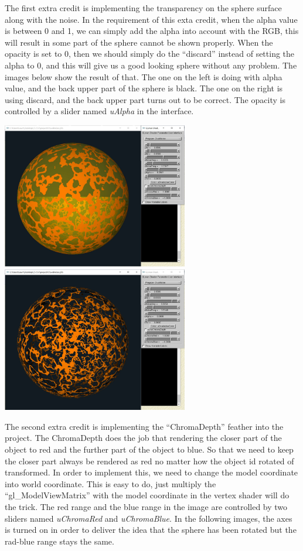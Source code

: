 \documentclass[letterpaper,14pt,titlepage,fleqn]{article}
\begin{document}
The first extra credit is implementing the transparency on the sphere surface along with the noise. In the requirement of this exta credit, when the alpha value is between 0 and 1, we can simply add the alpha into account with the RGB, this will result in some part of the sphere cannot be shown properly. When the opacity is set to 0, then we should simply do the ``discard'' instead of setting the alpha to 0, and this will give us a good looking sphere without any problem. The images below show the result of that. The one on the left is doing with alpha value, and the back upper part of the sphere is black. The one on the right is using discard, and the back upper part turns out to be correct. The opacity is controlled by a slider named \textit{uAlpha} in the interface.
\begin{center}
	\includegraphics[width=3.2in]{E11.jpg}
	\includegraphics*[width=3.2in]{E12.jpg}
\end{center}
The second extra credit is implementing the ``ChromaDepth'' feather into the project. The ChromaDepth does the job that rendering the closer part of the object to red and the further part of the object to blue. So that we need to keep the closer part always be rendered as red no matter how the object id rotated of transformed. In order to implement this, we need to change the model coordinate into world coordinate. This is easy to do, just multiply the ``gl\_ModelViewMatrix'' with the model coordinate in the vertex shader will do the trick. The red range and the blue range in the image are controlled by two sliders named \textit{uChromaRed} and \textit{uChromaBlue}. In the following images, the axes is turned on in order to deliver the idea that the sphere has been rotated but the rad-blue range stays the same.
\end{document}
